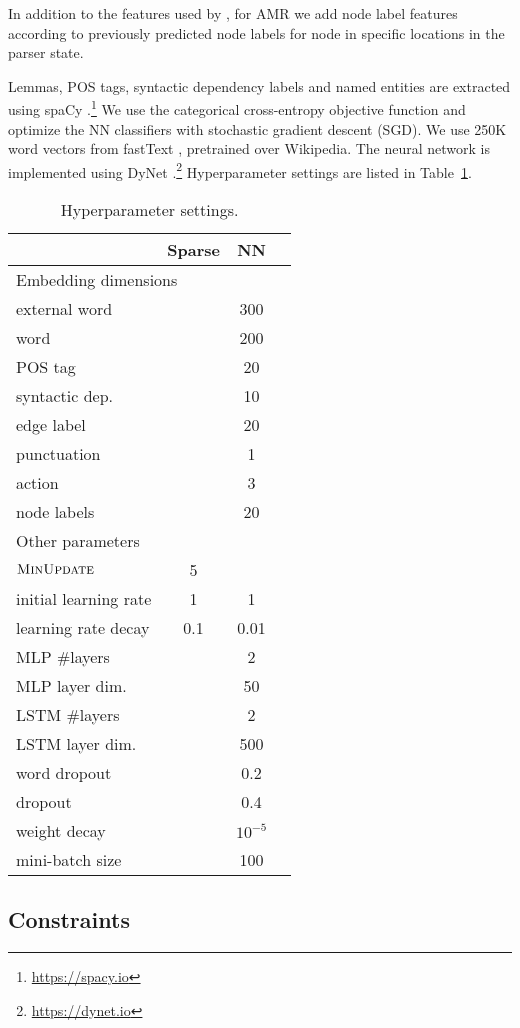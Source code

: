 \documentclass[11pt,a4paper]{article}
\begin{document}
In addition to the features used by \citet{hershcovich2017a},
for AMR we add node label features according to
previously predicted node labels for node in specific locations in the parser state.

Lemmas, POS tags, syntactic dependency labels and named entities are extracted using spaCy
\cite{spacy2}.\footnote{\url{https://spacy.io}}
We use the categorical cross-entropy objective function and optimize the
NN classifiers with stochastic gradient descent (SGD).
We use 250K word vectors from fastText \cite{bojanowski2016enriching}, pretrained over Wikipedia.
The neural network is implemented using DyNet \cite{neubig2017dynet}.\footnote{\url{https://dynet.io}}
Hyperparameter settings are listed in Table~\ref{tab:hyperparams}.

\begin{table}
\begin{tabular}{l|ccc}
& Sparse & NN \\
\hline
\multicolumn{3}{l}{\footnotesize Embedding dimensions} \\
external word & & 300 \\
word & & 200 \\
POS tag & & 20 \\
syntactic dep. & & 10 \\
edge label & & 20 \\
punctuation & & 1 \\
action & & 3 \\
node labels & & 20 \\
\hline
\multicolumn{3}{l}{\footnotesize Other parameters} \\
$\textsc{MinUpdate}$ & 5 \\
initial learning rate & 1 & 1 \\
learning rate decay & 0.1 & 0.01 \\
MLP \#layers & & 2 \\
MLP layer dim. & & 50 \\
LSTM \#layers & & 2 \\
LSTM layer dim. & & 500 \\
word dropout & & 0.2 \\
dropout & & 0.4 \\
weight decay & & $10^{-5}$ \\
mini-batch size & & 100
\end{tabular}
\caption{Hyperparameter settings.\label{tab:hyperparams}}
\end{table}


\subsection{Constraints}
\end{document}

